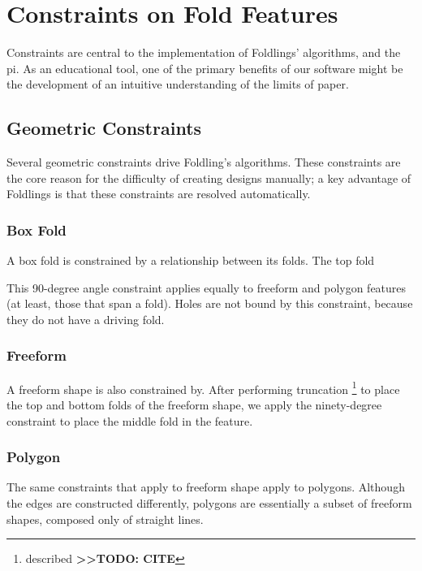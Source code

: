 \section{Constraints on Fold
Features}\label{constraints-on-fold-features}

Constraints are central to the implementation of Foldlings' algorithms,
and the pi. As an educational tool, one of the primary benefits of our
software might be the development of an intuitive understanding of the
limits of paper.

\subsection{Geometric Constraints}\label{geometric-constraints}

Several geometric constraints drive Foldling's algorithms. These
constraints are the core reason for the difficulty of creating designs
manually; a key advantage of Foldlings is that these constraints are
resolved automatically.

\subsubsection{Box Fold}\label{box-fold}

A box fold is constrained by a relationship between its folds. The top
fold

This 90-degree angle constraint applies equally to freeform and polygon
features (at least, those that span a fold). Holes are not bound by this
constraint, because they do not have a driving fold.

\subsubsection{Freeform}\label{freeform}

A freeform shape is also constrained by. After performing truncation
\footnote{described \textbf{\textgreater{}\textgreater{}TODO: CITE}} to
place the top and bottom folds of the freeform shape, we apply the
ninety-degree constraint to place the middle fold in the feature.

\subsubsection{Polygon}\label{polygon}

The same constraints that apply to freeform shape apply to polygons.
Although the edges are constructed differently, polygons are essentially
a subset of freeform shapes, composed only of straight lines.

